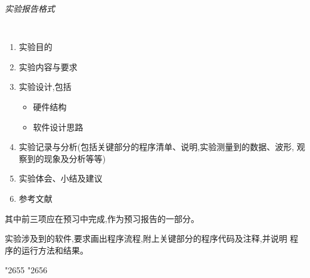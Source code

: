 \setcounter{chapter}{0}
\begin{center} \LARGE \it \textsf{实验报告格式} \end{center}
\large \tt
\begin{enumerate}\itemsep=-3pt
  \item 实验目的
  \item 实验内容与要求
  \item 实验设计,包括
  \begin{itemize}
    \item 硬件结构
    \item 软件设计思路
  \end{itemize}
  \item 实验记录与分析(包括关键部分的程序清单、说明,实验测量到的数据、波形,
        观察到的现象及分析等等)
  \item 实验体会、小结及建议
  \item 参考文献
\end{enumerate}
其中前三项应在预习中完成,作为预习报告的一部分。

    实验涉及到的软件,要求画出程序流程,附上关键部分的程序代码及注释,并说明
程序的运行方法和结果。

\begin{center} \char"2655 \char"2656 \end{center}
\iffalse

    *实验提倡独立思考,鼓励创新钻研。教师在指导实验中可适当地配以示教,但不
提倡简单的``有问必答''。
  
    *学生实验结束,须经教师检查签字认可,并及时书写实验报告。实验报告应以原始
记录为依据,可在预习报告的基础上,增添整理实验纪录和分析、实验体会与小结。
实验报告应及时完成。
\fi
\rm\normalsize
